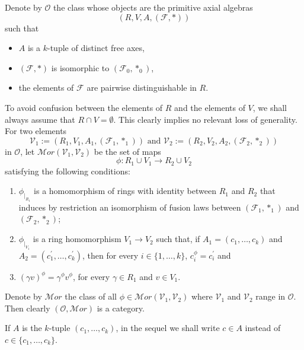 \documentclass[a4paper]{amsart}
\begin{document}
Denote by 
${\mathcal O}$  the class whose objects are the primitive axial algebras 
$$
(R, V, A, (\mathcal F, \ast) )
$$
such that 
\begin{itemize}
\item [{\rm O1}]$A$ is a $k$-tuple of distinct free axes, 
\item [{\rm O2}]$(\mathcal F, \ast)$ is isomorphic to $(\mathcal F_0,  \ast_0)$, 
\item  [{\rm O3}] the elements of $\mathcal F$ are pairwise distinguishable in $R$.
\end{itemize}
To avoid confusion between the elements of $R$ and the elements of $V$, we shall always assume that $R\cap V=\emptyset$. This clearly implies no relevant loss of generality.
\noindent For two elements 
\begin{equation} \label{v1v2}
{\mathcal V_1}:=(R_1, V_1,A_1, (\mathcal F_1, \ast_1) ) \mbox{ and }{\mathcal V}_2:=(R_2, V_2, A_2, (\mathcal F_2, \ast_2 ))
\end{equation}
in ${\mathcal O}$,
let ${\mathcal Mor}({\mathcal V}_1,{\mathcal  V}_2)$ be the set of maps
$$\phi\colon R_1 \cup V_1 \to R_2\cup V_2$$ 
satisfying the following conditions:
\begin {enumerate}
\item  [{\rm H1}] $\phi_{|_{R_1}}$ is a homomorphism of rings with identity between $R_1$ and $R_2$  that induces by restriction an isomorphism of fusion laws between $({\mathcal F}_1,\ast_1)$ and $({\mathcal F}_2,\ast_2)$; 
\item  [{\rm H2}] $\phi_{|_{V_1}}$ is a ring homomorphism $V_1\to V_2$ such that, if $A_1=(c_1, \ldots , c_k)$ and $A_2=(c_1^\prime , \ldots , c_k^\prime)$, then for every $i\in \{1, \ldots , k\}$,  $c_i^\phi = c_i^\prime$ and \item  [{\rm H3}] $(\gamma v)^\phi=\gamma^\phi v^\phi$, for every $\gamma\in R_1$ and $v \in V_1$.
\end{enumerate}

Denote by $\mathcal Mor$ the class of all $\phi\in {\mathcal Mor}({\mathcal V_1},{\mathcal V_2})$ where ${\mathcal V_1}$ and ${\mathcal V_2}$ range in $\mathcal O$. Then clearly  $({\mathcal O},{\mathcal Mor})$ is a category.

If $A$ is the $k$-tuple $(c_1, \ldots , c_k)$, in the sequel we shall write $c\in A$ instead of $c\in \{c_1, \ldots , c_k\}$.
\end{document}
